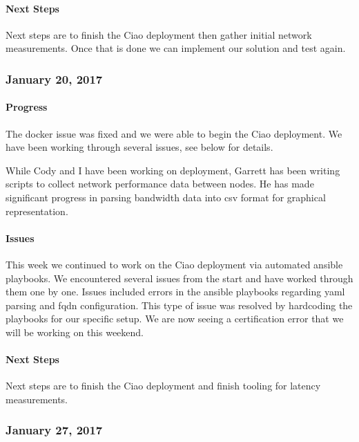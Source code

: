 \documentclass[10pt,onecolumn,journal,draftclsnofoot]{IEEEtran}
\begin{document}
\paragraph{Next Steps} 

Next steps are to finish the Ciao deployment then gather initial network
measurements. Once that is done we can implement our solution and test
again.

\subsubsection{January 20, 2017} 

\paragraph{Progress} 

The docker issue was fixed and we were able to begin the Ciao
deployment. We have been working through several issues, see below for
details.

While Cody and I have been working on deployment, Garrett has been
writing scripts to collect network performance data between nodes. He
has made significant progress in parsing bandwidth data into csv format
for graphical representation.

\paragraph{Issues} 

This week we continued to work on the Ciao deployment via automated
ansible playbooks. We encountered several issues from the start and have
worked through them one by one. Issues included errors in the ansible
playbooks regarding yaml parsing and fqdn configuration. This type of
issue was resolved by hardcoding the playbooks for our specific setup.
We are now seeing a certification error that we will be working on this
weekend.

\paragraph{Next Steps} 

Next steps are to finish the Ciao deployment and finish tooling for
latency measurements.

\subsubsection{January 27, 2017} 
\end{document}
